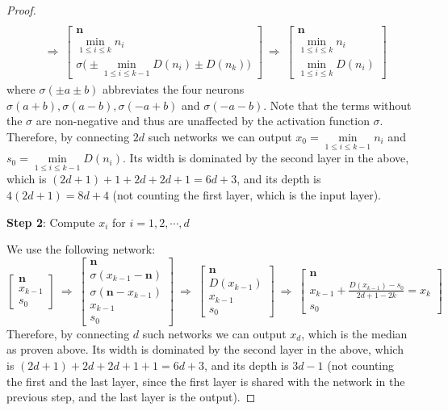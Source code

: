 \documentclass{article}
\numberwithin{equation}{section}
\theoremstyle{definition}
\begin{document}
\begin{proof}
\begin{align*}
    \\
    \ &\Longrightarrow \
    \begin{bmatrix} \mathbf{n} \\ \min\limits_{1\le i\le k}{n_i} \\ 
    \sigma\Big(
    \pm\min\limits_{1\le i\le k-1}{D(n_i)} \pm D(n_k)
    \Big) 
    \end{bmatrix}
    \ \Longrightarrow \
    \begin{bmatrix} \mathbf{n} \\ \min\limits_{1\le i\le k}{n_i} \\ \min\limits_{1\le i\le k}{D(n_i)} \end{bmatrix}
\end{align*}
where $\sigma(\pm a\pm b)$ abbreviates the four neurons $\sigma(a+b),\sigma(a-b),\sigma(-a+b)$ and $\sigma(-a-b)$. Note that the terms without the $\sigma$ are non-negative and thus are unaffected by the activation function $\sigma$. Therefore, by connecting $2d$ such networks we can output $x_0=\min\limits_{1\le i\le k-1}{n_i}$ and $s_0=\min\limits_{1\le i\le k-1}{D(n_i)}$. Its width is dominated by the second layer in the above, which is $(2d+1)+1+2d+2d+1=6d+3$, and its depth is $4(2d+1)=8d+4$ (not counting the first layer, which is the input layer).

\textbf{Step 2}: Compute $x_i$ for $i=1,2,\cdots,d$

We use the following network:
$$
\begin{bmatrix} \mathbf{n} \\ x_{k-1} \\ s_0 \end{bmatrix}
\ \Longrightarrow \
\begin{bmatrix} \mathbf{n} \\ \sigma(x_{k-1}-\mathbf{n}) \\ \sigma(\mathbf{n}-x_{k-1}) \\ x_{k-1} \\ s_0 \end{bmatrix}
\ \Longrightarrow \
\begin{bmatrix} \mathbf{n} \\ D(x_{k-1}) \\ x_{k-1} \\ s_0 \end{bmatrix}
\ \Longrightarrow \
\begin{bmatrix} \mathbf{n} \\ \displaystyle x_{k-1}+\frac{D(x_{k-1})-s_0}{2d+1-2k}=x_k \\ s_0 \end{bmatrix}
$$
Therefore, by connecting $d$ such networks we can output $x_d$, which is the median as proven above. Its width is dominated by the second layer in the above, which is $(2d+1)+2d+2d+1+1=6d+3$, and its depth is $3d-1$ (not counting the first and the last layer, since the first layer is shared with the network in the previous step, and the last layer is the output).


\end{proof}
\end{document}
